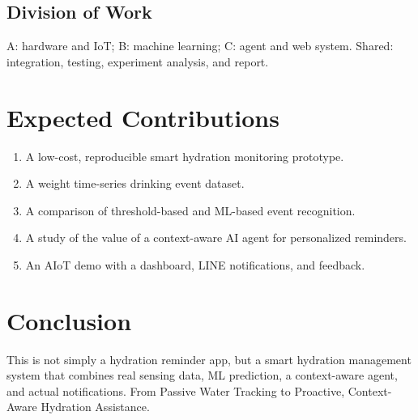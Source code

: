 \documentclass[conference]{IEEEtran}
\begin{document}
\subsection{Division of Work}
A: hardware and IoT; B: machine learning; C: agent and web system. Shared: integration, testing, experiment analysis, and report.

\section{Expected Contributions}\label{sec:contributions}

\begin{enumerate}
\item A low-cost, reproducible smart hydration monitoring prototype.
\item A weight time-series drinking event dataset.
\item A comparison of threshold-based and ML-based event recognition.
\item A study of the value of a context-aware AI agent for personalized reminders.
\item An AIoT demo with a dashboard, LINE notifications, and feedback.
\end{enumerate}

\section{Conclusion}\label{sec:conclusion}

This is not simply a hydration reminder app, but a smart hydration management system that combines real sensing data, ML prediction, a context-aware agent, and actual notifications. From Passive Water Tracking to Proactive, Context-Aware Hydration Assistance.



\end{document}
